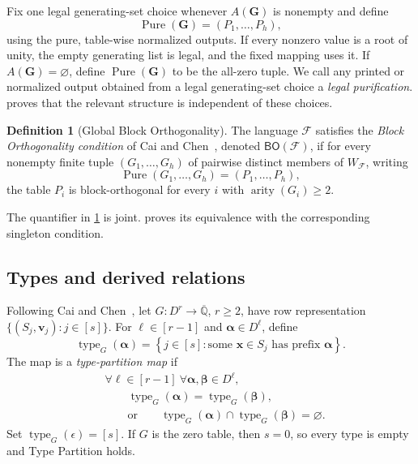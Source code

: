 \documentclass[11pt]{article}
\theoremstyle{plain}
\theoremstyle{definition}
\newtheorem{definition}[definition]{Definition}
\theoremstyle{remark}
\newcommand{\AlgNums}{\overline{\mathbb Q}}
\newcommand{\cF}{\mathcal F}
\newcommand{\BO}{\mathsf{BO}}
\newcommand{\emptytuple}{\epsilon}
\DeclareMathOperator{\Pure}{Pure}
\DeclareMathOperator{\arity}{arity}
\DeclareMathOperator{\typeop}{type}
\begin{document}
Fix one legal generating-set choice whenever $A(\mathbf G)$ is nonempty and
define
\[
  \Pure(\mathbf G)=(P_1,\ldots,P_h),
\]
using the pure, table-wise normalized outputs.  If every nonzero value is a
root of unity, the empty generating list is legal, and the fixed mapping uses
it.  If $A(\mathbf G)=\varnothing$, define $\Pure(\mathbf G)$ to be the
all-zero tuple.  We call any printed or normalized output obtained from a
legal generating-set choice a \emph{legal purification}.
 proves that the relevant structure is
independent of these choices.

\begin{definition}[Global Block Orthogonality]
\label{def:global-bo}
The language $\cF$ satisfies the \emph{Block Orthogonality condition} of Cai
and Chen~\cite[Section~3.1]{CaiChen2017}, denoted $\BO(\cF)$, if for every
nonempty finite tuple
$(G_1,\ldots,G_h)$ of pairwise distinct members of $W_{\cF}$, writing
\[
  \Pure(G_1,\ldots,G_h)=(P_1,\ldots,P_h),
\]
the table $P_i$ is block-orthogonal for every $i$ with
$\arity(G_i)\ge2$.
\end{definition}

The quantifier in \cref{def:global-bo} is joint.
 proves its equivalence with the
corresponding singleton condition.

\subsection{Types and derived relations}

Following Cai and Chen~\cite[Sections~2.8--2.9 and~3.1]{CaiChen2017}, let
$G:D^r\to\AlgNums$, $r\ge2$, have row representation
$\{(S_j,\mathbf v_j):j\in[s]\}$.  For $\ell\in[r-1]$ and
$\boldsymbol\alpha\in D^\ell$, define
\begin{equation*}
  \typeop_G(\boldsymbol\alpha)
  =\left\{j\in[s]:
       \text{some }\mathbf x\in S_j\text{ has prefix }
       \boldsymbol\alpha\right\}.
\end{equation*}
The map is a \emph{type-partition map} if
\begin{equation*}
  \begin{aligned}
  &\forall \ell\in[r-1]\ \forall
    \boldsymbol\alpha,\boldsymbol\beta\in D^\ell,\\
  &\qquad
    \typeop_G(\boldsymbol\alpha)=\typeop_G(\boldsymbol\beta),\\[-2pt]
  &\qquad\text{or}\qquad
    \typeop_G(\boldsymbol\alpha)
      \cap\typeop_G(\boldsymbol\beta)=\varnothing.
  \end{aligned}
\end{equation*}
Set $\typeop_G(\emptytuple)=[s]$.  If $G$ is the zero table, then $s=0$, so
every type is empty and Type Partition holds.
\end{document}
